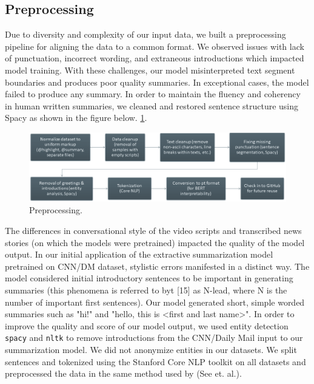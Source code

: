 \documentclass{article}
\begin{document}
\subsection{Preprocessing}
\label{Preprocessing}

Due to diversity and complexity of our input data, we built a preprocessing pipeline for aligning the data to a common format. We observed issues with lack of punctuation, incorrect wording, and extraneous introductions which impacted model training. With these challenges, our model misinterpreted text segment boundaries and produces poor quality summaries. In exceptional cases, the model failed to produce any summary. In order to maintain the fluency and coherency in human written summaries, we cleaned and restored sentence structure using Spacy as shown in the figure below. \ref{fig:preprocessing}.

\begin{figure}[H]
  \includegraphics[width=\linewidth]{preprocessing.PNG}
  \caption{Preprocessing.}
  \label{fig:preprocessing}
\end{figure}

The differences in conversational style of the video scripts and transcribed news stories (on which the models were pretrained) impacted the quality of the model output. In our initial application of the extractive summarization model pretrained on CNN/DM dataset, stylistic errors manifested in a distinct way. The model considered initial introductory sentences to be important in generating summaries (this phenomena is referred to byt [15] as N-lead, where N is the number of important first sentences). Our model generated short, simple worded summaries such as "hi!" and "hello, this is <first and last name>". In order to improve the quality and score of our model output, we used entity detection   \verb+spacy+ and \verb+nltk+ to remove introductions from the CNN/Daily Mail  input to our summarization model. We did not anonymize entities in our datasets. We split sentences and tokenized using the Stanford Core NLP toolkit on all datasets and preprocessed the data in the same method used by (See et. al.).  
\end{document}
